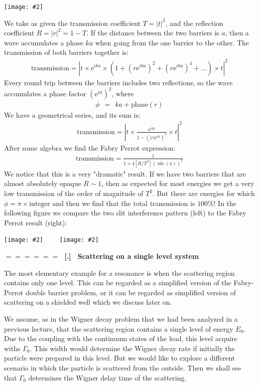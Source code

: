 \documentclass[onecolumn,fleqn]{revtex4}
\newcommand{\eexp}{\mathrm{e}^}
\newcommand{\putgraph}[2][0.30\hsize]{\texttt{[image: \#2]}}
\newcommand{\putgraphr}[2][0.30\hsize]{\texttt{[image: \#2]}}
\newcommand{\beq}{\begin{eqnarray}}
\newcommand{\eeq}{\end{eqnarray}}
\renewcommand{\thesubsection}{\arabic{subsection}}
\renewcommand{\thesubsubsection}{\arabic{subsubsection}}
\newcommand{\sheadC}[1]
{
\addtocounter{subsubsection}{1}
\vspace{5mm}
{\Large\bf $=\!=\!=\!=\!=\!=\;$ [\thesubsection.\thesubsubsection] \ #1}  
\nopagebreak
\phantomsection
}
\begin{document}
\begin{center}
\putgraph[0.4\hsize]{FabryPerrot} 
\end{center}

We take as given the transmission coefficient ${T=|t|^2}$, 
and the reflection coefficient ${ R=|r|^2=1-T }$. 
If the distance between the two barriers is ${a}$,  
then a wave accumulates a phase ${ka}$ 
when going from the one barrier to the other. 
The transmission of both barriers together is:
\beq
\mbox{transmission}= | t \times \eexp{ika} \times (1+(r\eexp{ika})^2 + (r\eexp{ika})^4 +  \dots  ) \times t |^2 
\eeq
Every round trip between the barriers includes two reflections, 
so the wave accumulates a phase factor ${(\eexp{i\phi})^2}$, where
\beq
\phi \ \ = \ \ ka + \text{phase}(r)
\eeq
We have a geometrical series, and its sum is:
\beq
\mbox{transmission}= \left|t \times \frac{\eexp{ika}} { 1 - \left( |r| \eexp{i\phi} \right)^2 } \times t \right|^2 
\eeq
After some algebra we find the Fabry Perrot expression:
\beq
\mbox{transmission}= \frac{1}{1+4[R/T^2](\sin(\phi))^2} 
\eeq
We notice that this is a very "dramatic" result. 
If we have two barriers that are almost absolutely opaque ${R\sim1}$, 
then as expected for most energies we get a very low transmission 
of the order of magnitude of ${T^2}$. But there are energies 
for which ${\phi=\pi \times \mbox{integer}}$ and then we find 
that the total transmission is $100\%$!
In the following figure we compare the two slit 
interference pattern (left) to the Fabry Perrot result (right):


\begin{center}
\putgraph[0.3\hsize]{IntensityInterferencePattern}
\ \ \ \ 
\putgraphr[0.3\hsize]{FabryPerrotTransmission} 
\end{center}






\sheadC{Scattering on a single level system}

The most elementary example for a resonance is when 
the scattering region contains only one level. 
This can be regarded as a simplified version of 
the Fabry-Perrot double barrier problem, 
or it can be regarded as simplified version of 
scattering on a shielded well which we discuss 
later on. 
  
   
We assume, as in the Wigner decay problem that we had been analyzed 
in a previous lecture, that the scattering region contains 
a single level of energy $E_0$. Due to the coupling 
with the continuum states of the lead, 
this level acquire withs $\Gamma_0$. This width would 
determine the Wigner decay rate if initially the particle 
were prepared in this level. But we would like to 
explore a different scenario in which the particle 
is scattered from the outside. Then we shall see 
that $\Gamma_0$ determines the Wigner delay time of the scattering.     
  
\end{document}
